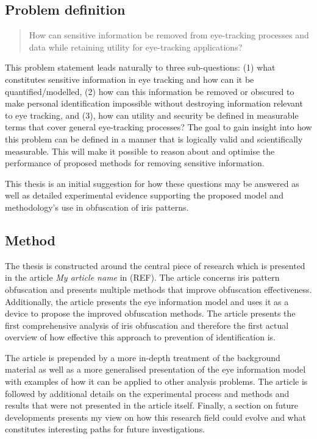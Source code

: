 
\subsection{Problem definition}


\begin{quotation}
How can sensitive information be removed from eye-tracking processes and data while retaining utility for eye-tracking applications?
\end{quotation}

This problem statement leads naturally to three sub-questions: (1) what constitutes sensitive information in eye tracking and how can it be quantified/modelled, (2) how can this information be removed or obscured to make personal identification impossible without destroying information relevant to eye tracking, and (3), how can utility and security be defined in measurable terms that cover general eye-tracking processes? The goal to gain insight into how this problem can be defined in a manner that is logically valid and scientifically measurable. This will make it possible to reason about and optimise the performance of proposed methods for removing sensitive information. 

This thesis is an initial suggestion for how these questions may be answered as well as detailed experimental evidence supporting the proposed model and methodology's use in obfuscation of iris patterns.

\subsection{Method}
The thesis is constructed around the central piece of research which is presented in the article \emph{My article name} in (REF). The article concerns iris pattern obfuscation and presents multiple methods that improve obfuscation effectiveness. Additionally, the article presents the eye information model and uses it as a device to propose the improved obfuscation methods. The article presents the first comprehensive analysis of iris obfuscation and therefore the first actual overview of how effective this approach to prevention of identification is.

The article is prepended by a more in-depth treatment of the background material as well as a more generalised presentation of the eye information model with examples of how it can be applied to other analysis problems. The article is followed by additional details on the experimental process and methods and results that were not presented in the article itself. Finally, a section on future developments presents my view on how this research field could evolve and what constitutes interesting paths for future investigations.